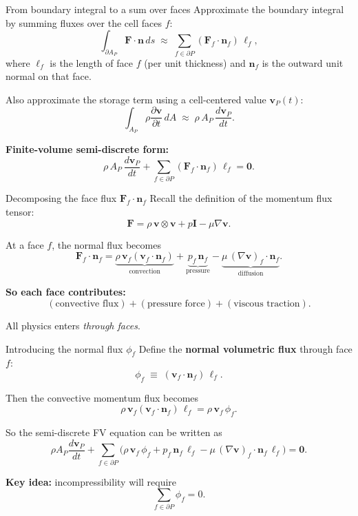 \documentclass[aspectratio=169]{beamer}
\begin{document}
\begin{frame}{From boundary integral to a sum over faces}
Approximate the boundary integral by summing fluxes over the cell faces $f$:
\[
\int_{\partial A_P}\mathbf{F}\cdot\mathbf{n}\,ds
\;\approx\;
\sum_{f\in\partial P}\left(\mathbf{F}_f\cdot\mathbf{n}_f\right)\,\ell_f,
\]
where $\ell_f$ is the length of face $f$ (per unit thickness) and
$\mathbf{n}_f$ is the outward unit normal on that face.

\bigskip
Also approximate the storage term using a cell-centered value $\mathbf{v}_P(t)$:
\[
\int_{A_P}\rho \frac{\partial \mathbf{v}}{\partial t}\,dA
\;\approx\;
\rho\,A_P\,\frac{d\mathbf{v}_P}{dt}.
\]

\bigskip
\textbf{Finite-volume semi-discrete form:}
\[
\boxed{
\rho\,A_P\,\frac{d\mathbf{v}_P}{dt}
+
\sum_{f\in\partial P}\left(\mathbf{F}_f\cdot\mathbf{n}_f\right)\,\ell_f
=
\mathbf{0}.
}
\]
\end{frame}

\begin{frame}{Decomposing the face flux $\mathbf{F}_f\cdot\mathbf{n}_f$}
Recall the definition of the momentum flux tensor:
\[
\mathbf{F}
=
\rho\,\mathbf{v}\otimes\mathbf{v}
+
p\mathbf{I}
-
\mu\nabla\mathbf{v}.
\]

\bigskip
At a face $f$, the normal flux becomes
\[
\mathbf{F}_f\cdot\mathbf{n}_f
=
\underbrace{\rho\,\mathbf{v}_f(\mathbf{v}_f\cdot\mathbf{n}_f)}_{\text{convection}}
+
\underbrace{p_f\,\mathbf{n}_f}_{\text{pressure}}
-
\underbrace{\mu\,(\nabla\mathbf{v})_f\cdot\mathbf{n}_f}_{\text{diffusion}}.
\]

\bigskip
\textbf{So each face contributes:}
\[
(\text{convective flux})
+
(\text{pressure force})
+
(\text{viscous traction}).
\]

\bigskip
All physics enters \emph{through faces}.
\end{frame}

\begin{frame}{Introducing the normal flux $\phi_f$}
Define the \textbf{normal volumetric flux} through face $f$:
\[
\phi_f
\;\equiv\;
(\mathbf{v}_f \cdot \mathbf{n}_f)\,\ell_f.
\]

\bigskip
Then the convective momentum flux becomes
\[
\rho\,\mathbf{v}_f(\mathbf{v}_f\cdot\mathbf{n}_f)\,\ell_f
=
\rho\,\mathbf{v}_f\,\phi_f.
\]

\bigskip
So the semi-discrete FV equation can be written as
\[
\rho A_P \frac{d\mathbf{v}_P}{dt}
+
\sum_{f\in\partial P}
\Big(
\rho\,\mathbf{v}_f\,\phi_f
+
p_f\,\mathbf{n}_f\,\ell_f
-
\mu\,(\nabla\mathbf{v})_f\cdot\mathbf{n}_f\,\ell_f
\Big)
=
\mathbf{0}.
\]

\bigskip
\textbf{Key idea:} incompressibility will require
\[
\sum_{f\in\partial P} \phi_f = 0.
\]
\end{frame}
\end{document}
